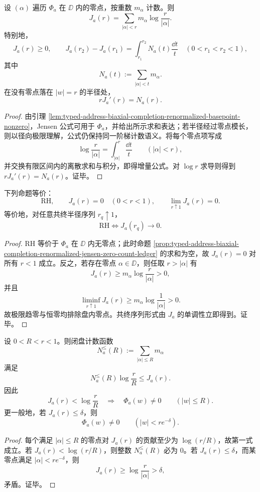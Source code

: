 \begin{proposition}\label{prop:typed-address-biaxial-completion-renormalized-jensen-zero-count-ledger}
设 \((\alpha)\) 遍历 \(\Phi_a\) 在 \(\DD\) 内的零点，按重数 \(m_\alpha\) 计数。则
\[
J_a(r)
=
\sum_{|\alpha|<r}m_\alpha\log\frac r{|\alpha|}.
\]
特别地，
\[
J_a(r)\ge0,
\qquad
J_a(r_2)-J_a(r_1)
=
\int_{r_1}^{r_2}N_a(t)\frac{\dd t}{t}
\quad(0<r_1<r_2<1),
\]
其中
\[
N_a(t):=\sum_{|\alpha|<t}m_\alpha.
\]
在没有零点落在 \(|w|=r\) 的半径处，
\[
rJ_a'(r)=N_a(r).
\]
\end{proposition}
\begin{proof}
由引理 \ref{lem:typed-address-biaxial-completion-renormalized-basepoint-nonzero}，Jensen 公式可用于 \(\Phi_a\)，并给出所示求和表达；若半径经过零点模长，则以径向极限理解，公式仍保持同一阶梯计数语义。将每个零点项写成
\[
\log\frac r{|\alpha|}
=
\int_{|\alpha|}^{r}\frac{\dd t}{t}
\qquad(|\alpha|<r),
\]
并交换有限区间内的离散求和与积分，即得增量公式。对 \(\log r\) 求导则得到 \(rJ_a'(r)=N_a(r)\)。证毕。
\end{proof}

\begin{theorem}\label{thm:typed-address-biaxial-completion-renormalized-jensen-rh-equivalence}
下列命题等价：
\[
\mathrm{RH},
\qquad
J_a(r)=0\quad(0<r<1),
\qquad
\lim_{r\uparrow1}J_a(r)=0.
\]
等价地，对任意共终半径序列 \(r_q\uparrow1\)，
\[
\mathrm{RH}
\iff
J_a(r_q)\longrightarrow0.
\]
\end{theorem}
\begin{proof}
RH 等价于 \(\Phi_a\) 在 \(\DD\) 内无零点；此时命题 \ref{prop:typed-address-biaxial-completion-renormalized-jensen-zero-count-ledger} 的求和为空，故 \(J_a(r)=0\) 对所有 \(r<1\) 成立。反之，若存在零点 \(\alpha\in\DD\)，则任取 \(r>|\alpha|\) 有
\[
J_a(r)\ge m_\alpha\log\frac r{|\alpha|}>0,
\]
并且
\[
\liminf_{r\uparrow1}J_a(r)
\ge
m_\alpha\log\frac1{|\alpha|}>0.
\]
故极限趋零与恒零均排除盘内零点。共终序列形式由 \(J_a\) 的单调性立即得到。证毕。
\end{proof}

\begin{proposition}\label{prop:typed-address-biaxial-completion-renormalized-jensen-repulsion-certificate}
设 \(0<R<r<1\)。则闭盘计数函数
\[
N_a^{\le}(R):=\sum_{|\alpha|\le R}m_\alpha
\]
满足
\[
N_a^{\le}(R)\log\frac rR\le J_a(r).
\]
因此
\[
J_a(r)<\log\frac rR
\quad\Longrightarrow\quad
\Phi_a(w)\ne0\qquad(|w|\le R).
\]
更一般地，若 \(J_a(r)\le\delta\)，则
\[
\Phi_a(w)\ne0\qquad(|w|<re^{-\delta}).
\]
\end{proposition}
\begin{proof}
每个满足 \(|\alpha|\le R\) 的零点对 \(J_a(r)\) 的贡献至少为 \(\log(r/R)\)，故第一式成立。若 \(J_a(r)<\log(r/R)\)，则整数 \(N_a^{\le}(R)\) 必为 \(0\)。若 \(J_a(r)\le\delta\)，而某零点满足 \(|\alpha|<re^{-\delta}\)，则
\[
J_a(r)\ge\log\frac r{|\alpha|}>\delta,
\]
矛盾。证毕。
\end{proof}

